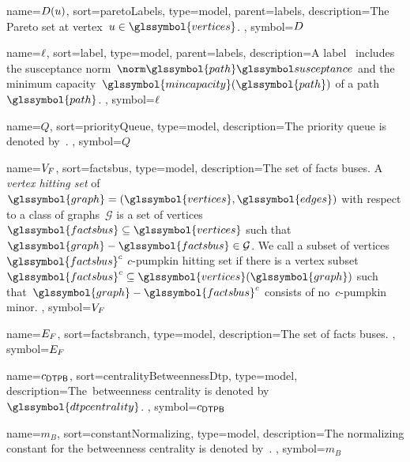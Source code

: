 {
    name={\ensuremath{ \paretolabels(\vertexa) }},
    sort={paretoLabels},
    type={model},
    parent={labels},
    description={The Pareto set at vertex~$\vertexa\in\glssymbol{vertices}$.
    },
    symbol={\ensuremath{ \paretolabels }}
}

{
    name={\ensuremath{ \lab }},
    sort={label},
    type={model},
    parent={labels},
    description={A label~ includes the susceptance
    norm~$\bnorm{\glssymbol{path}}$ and the minimum
    capacity~$\glssymbol{mincapacity}(\glssymbol{path})$ of a path~$
    \glssymbol{path}$.
    },
    symbol={\ensuremath{ \lab }}
}

{
    name={\ensuremath{ Q }},
    sort={priorityQueue},
    type={model},
    description={The priority queue is denoted by~.
    },
    symbol={\ensuremath{ Q }}
}

{
    name={\ensuremath{ \factsbus }},
    sort={factsbus},
    type={model},
    description={The set of facts buses.
    A \emph{vertex hitting set} of~$\glssymbol{graph} =
    (\glssymbol{vertices},\glssymbol{edges})$ with respect to a class of
    graphs~$\mathcal G$ is a set of
    vertices~$\glssymbol{factsbus}\subseteq\glssymbol{vertices}$ such
    that~$\glssymbol{graph}-\glssymbol{factsbus} \in \mathcal G$.
    We call a subset of vertices~$\glssymbol{factsbus}^c$ $c$-pumpkin hitting
    set if there is a vertex
    subset~$\glssymbol{factsbus}^c\subseteq\glssymbol{vertices}(\glssymbol{graph})$
    such that~$
    \glssymbol{graph}-\glssymbol{factsbus}^c$ consists of no~$c$-pumpkin minor.
    },
    symbol={\ensuremath{ \factsbus }}
}

{
    name={\ensuremath{ \factsbranch }},
    sort={factsbranch},
    type={model},
    description={The set of facts buses.
    },
    symbol={\ensuremath{ \factsbranch }}
}

{
    name={\ensuremath{ c_{\sbc} }},
    sort={centralityBetweennessDtp},
    type={model},
    description={The~\dtp betweenness centrality is denoted by~$\glssymbol{dtpcentrality}$.
    },
    symbol={\ensuremath{ c_{\sbc} }}
}

{
    name={\ensuremath{ m_B }},
    sort={constantNormalizing},
    type={model},
    description={The normalizing constant for the betweenness centrality is
    denoted by~.
    },
    symbol={\ensuremath{ m_B }}
}

